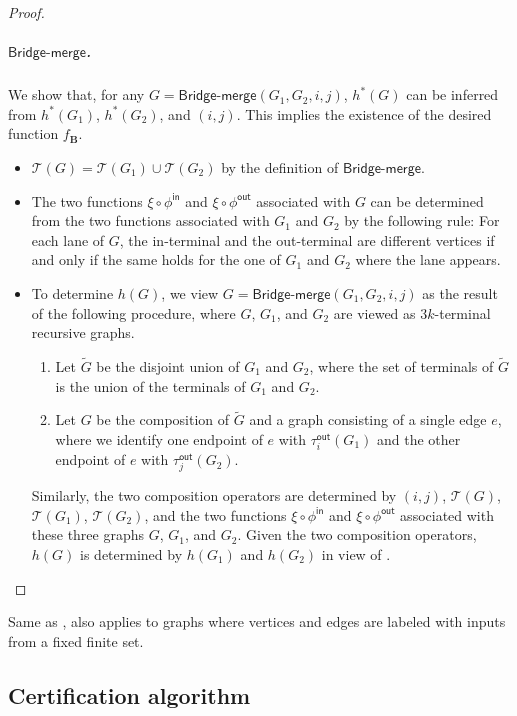 \documentclass[11pt]{article}
\theoremstyle{definition}
\theoremstyle{remark}
\newcommand{\tout}{\tau^{\mathsf{out}}}
\newcommand{\fin}{\phi^{\mathsf{in}}}
\newcommand{\fout}{\phi^{\mathsf{out}}}
\newcommand{\bmerge}{\mathsf{Bridge}\text{-}\mathsf{merge}}
\newcommand{\fb}{f_{\mathbf{B}}}
\begin{document}
\begin{proof}
\subparagraph{$\bmerge$.} We show that, for any $G = \bmerge(G_1, G_2, i, j)$,  $h^\ast(G)$ can be inferred from $h^\ast(G_1)$, $h^\ast(G_2)$, and $(i,j)$. This implies the existence of the desired function $\fb$.
\begin{itemize}
\item $\mathcal{T}(G) = \mathcal{T}(G_1) \cup \mathcal{T}(G_2)$ by the definition of $\bmerge$.
\item The two functions $\xi\circ \fin$ and $\xi\circ \fout$ associated with $G$ can be determined from the two functions associated with $G_1$ and $G_2$ by the following rule: For each lane of $G$, the in-terminal and the out-terminal are different vertices if and only if the same holds for the one of $G_1$ and $G_2$ where the lane appears.
    \item To determine $h(G)$, we view $G = \bmerge(G_1, G_2, i, j)$ as the result of the following procedure, where $G$, $G_1$, and $G_2$ are viewed as $3k$-terminal recursive graphs.
    \begin{enumerate}
        \item Let $\tilde{G}$ be the disjoint union of $G_1$ and $G_2$, where the set of terminals of $\tilde{G}$ is the union of the terminals of $G_1$ and $G_2$.
        \item Let $G$ be the composition of $\tilde{G}$ and a graph consisting of a single edge $e$, where we identify one endpoint of $e$ with $\tout_i(G_1)$ and the other endpoint of $e$ with  $\tout_j(G_2)$.
    \end{enumerate}
    Similarly, the two composition operators are determined by $(i,j)$,  $\mathcal{T}(G)$, $\mathcal{T}(G_1)$, $\mathcal{T}(G_2)$, and the two functions $\xi\circ \fin$ and $\xi\circ \fout$ associated with these three graphs $G$, $G_1$, and $G_2$. 
    Given the two composition operators, $h(G)$ is determined by $h(G_1)$ and $h(G_2)$ in view of .    \qedhere
\end{itemize}
\end{proof}

Same as ,  also applies to graphs where vertices and edges are labeled with inputs from a fixed finite set. 

\subsection{Certification algorithm}\label{subsect:certification}
\end{document}
